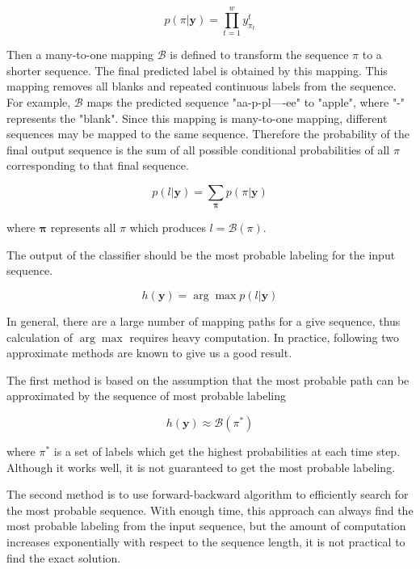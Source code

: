 \begin{equation}
    p(\pi |\mathbf{y}) = \prod_{t=1}^{w}y_{\pi_t}^{t}
\end{equation}

Then a many-to-one mapping $\mathcal{B}$ is defined to transform the sequence
$\pi$ to a shorter sequence. The final predicted label is obtained by this mapping.
This mapping removes all blanks and repeated continuous labels from the sequence.
For example, $\mathcal{B}$ maps the predicted sequence "aa-p-pl----ee" to "apple",
where "-" represents the "blank". Since this mapping is many-to-one mapping, different
sequences may be mapped to the same sequence. Therefore the probability of the final
output sequence is the sum of all possible conditional probabilities of all $\pi$ corresponding
to that final sequence.

\begin{equation}
    p(l|\mathbf{y}) = \sum_{\mathbf{\pi}} p(\pi | \mathbf{y})
\end{equation}

where $\mathbf{\pi}$ represents all $\pi$ which produces $l = \mathcal{B}(\pi)$.

The output of the classifier should be the most probable labeling for the input sequence.

\begin{equation}
    h(\mathbf{y}) = \arg\max p(l|\mathbf{y})
\end{equation}

In general, there are a large number of mapping paths for a give sequence, thus
calculation of $\arg\max$ requires heavy computation. In practice, following two approximate
methods are known to give us a good result.

The first method is based on the assumption that the most probable path can be approximated
by the sequence of most probable labeling

\begin{equation}
    h(\mathbf{y})\approx\mathcal{B}(\pi^*)
\end{equation}

where $\pi^{*}$ is a set of labels which get the highest probabilities at each time step.
Although it works well, it is not guaranteed to get the most probable labeling.

The second method is to use forward-backward algorithm to efficiently search for the most
probable sequence. With enough time, this approach can always find the most probable labeling
from the input sequence, but the amount of computation increases exponentially with respect to
the sequence length, it is not practical to find the exact solution.

